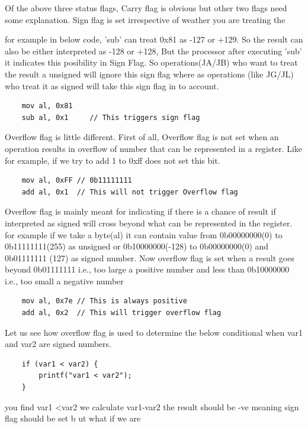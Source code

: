 \documentclass{article}
\begin{document}
Of the above three status flags, Carry flag is obvious but other two flags need
some explanation. Sign flag is set irrespective of weather you are treating the

for example in below code, 'sub' can treat 0x81 as -127 or +129. So the result
can also be either interpreted as -128 or +128, But the processor after
executing 'sub' it indicates this posibility in Sign Flag. So operations(JA/JB)
who want to treat the result a unsigned will ignore this sign flag where as
operations (like JG/JL) who treat it as signed will take this sign flag in to
account.
\begin{verbatim}
    mov al, 0x81
    sub al, 0x1     // This triggers sign flag
\end{verbatim}

Overflow flag is little different. First of all, Overflow flag is not set when
an operation results in overflow of number that can be represented in a
register. Like for example, if we try to add 1 to 0xff does not set this bit.
\begin{verbatim}
    mov al, 0xFF // 0b11111111
    add al, 0x1  // This will not trigger Overflow flag
\end{verbatim}
Overflow flag is mainly meant for indicating if there is a chance of result if
interpreted as signed will cross beyond what can be represented in the register.
for example if we take a byte(al) it can contain value from 0b00000000(0) to
0b11111111(255) as unsigned or 0b10000000(-128) to 0b00000000(0) and 0b01111111
(127) as signed number. Now overflow flag is set when a result goes beyond
0b01111111 i.e., too large a positive number and less than 0b10000000 i.e., too
small a negative number

\begin{verbatim}
    mov al, 0x7e // This is always positive
    add al, 0x2  // This will trigger overflow flag
\end{verbatim}

Let us see how overflow flag is used to determine the below conditional when
var1 and var2 are signed numbers.
\begin{verbatim}
    if (var1 < var2) {
        printf("var1 < var2");
    }
\end{verbatim}
you find var1 \textless var2 we calculate var1-var2 the result should be -ve
meaning sign flag should be set b ut what if we are
\end{document}
